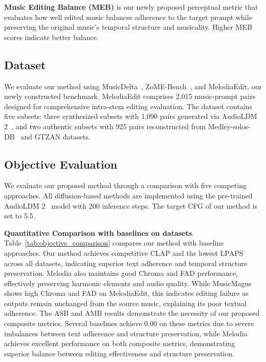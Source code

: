 \textbf{Music Editing Balance (MEB)} is our newly proposed perceptual metric that evaluates how well edited music balances adherence to the target prompt while preserving the original music's temporal structure and musicality. Higher MEB scores indicate better balance.

\subsection{Dataset}
\label{exp:dataset}
We evaluate our method using MusicDelta~\cite{bittner2014medleydb}, ZoME-Bench~\cite{liu2024medic}, and MelodiaEdit, our newly constructed benchmark. MelodiaEdit comprises 2,015 music-prompt pairs designed for comprehensive intra-stem editing evaluation. The dataset contains five subsets: three synthesized subsets with 1,090 pairs generated via AudioLDM 2~\cite{audioldm2}, and two authentic subsets with 925 pairs reconstructed from Medley-solos-DB~\cite{lostanlen2016realins} and GTZAN datasets. 

\subsection{Objective Evaluation}
\label{section quantitative}

We evaluate our proposed method through a comparison with five competing approaches. All diffusion-based methods are implemented using the pre-trained AudioLDM 2~\cite{audioldm2} model with 200 inference steps. The target CFG of our method is set to 5.5.

\textbf{Quantitative Comparison with baselines on datasets}. Table~\ref{tab:objective_comparison} compares our method with baseline approaches. Our method achieves competitive CLAP and the lowest LPAPS across all datasets, indicating superior text adherence and temporal structure preservation.
Melodia also maintains good Chroma and FAD performance, effectively preserving harmonic elements and audio quality.
While MusicMagus~\cite{magus} shows high Chroma and FAD on MelodiaEdit, this indicates editing failure as outputs remain unchanged from the source music, explaining its poor textual adherence.
The ASB and AMB results demonstrate the necessity of our proposed composite metrics. Several baselines achieve 0.00 on these metrics due to severe imbalances between text adherence and structure preservation, while Melodia achieves excellent performance on both composite metrics, demonstrating superior balance between editing effectiveness and structure preservation.

